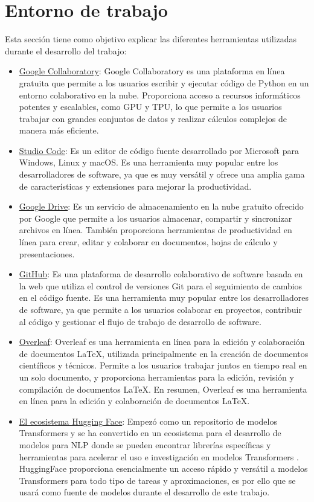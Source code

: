 \section{Entorno de trabajo}\label{entorno}
Esta sección tiene como objetivo explicar las diferentes herramientas utilizadas durante el desarrollo del trabajo:

    \begin{itemize}
        \item \href{https://colab.research.google.com/}{Google Collaboratory}: Google Collaboratory es una plataforma en línea gratuita que permite a los usuarios escribir y ejecutar código de Python en un entorno colaborativo en la nube. Proporciona acceso a recursos informáticos potentes y escalables, como GPU y TPU, lo que permite a los usuarios trabajar con grandes conjuntos de datos y realizar cálculos complejos de manera más eficiente.
        \item \href{https://code.visualstudio.com/Visual}{Studio Code}: Es un editor de código fuente desarrollado por Microsoft para Windows, Linux y macOS. Es una herramienta muy popular entre los desarrolladores de software, ya que es muy versátil y ofrece una amplia gama de características y extensiones para mejorar la productividad. 
        \item \href{https://www.google.com/intl/es_es/drive/}{Google Drive}: Es un servicio de almacenamiento en la nube gratuito ofrecido por Google que permite a los usuarios almacenar, compartir y sincronizar archivos en línea. También proporciona herramientas de productividad en línea para crear, editar y colaborar en documentos, hojas de cálculo y presentaciones.
        \item \href{https://github.com/}{GitHub}: Es una plataforma de desarrollo colaborativo de software basada en la web que utiliza el control de versiones Git para el seguimiento de cambios en el código fuente. Es una herramienta muy popular entre los desarrolladores de software, ya que permite a los usuarios colaborar en proyectos, contribuir al código y gestionar el flujo de trabajo de desarrollo de software.
        \item \href{https://www.overleaf.com/}{Overleaf}: Overleaf es una herramienta en línea para la edición y colaboración de documentos LaTeX, utilizada principalmente en la creación de documentos científicos y técnicos. Permite a los usuarios trabajar juntos en tiempo real en un solo documento, y proporciona herramientas para la edición, revisión y compilación de documentos LaTeX. En resumen, Overleaf es una herramienta en línea para la edición y colaboración de documentos LaTeX.
        \item \href{https://huggingface.co/}{El ecosistema Hugging Face}: Empezó como un repositorio de modelos Transformers y se ha convertido en un ecosistema para el desarrollo de modelos para NLP donde se pueden encontrar librerías específicas y herramientas para acelerar el uso e investigación en modelos Transformers \cite{tunstall2022natural}. HuggingFace proporciona esencialmente un acceso rápido y versátil a modelos Transformers para todo tipo de tareas y aproximaciones, es por ello que se usará como fuente de modelos durante el desarrollo de este trabajo.


\end{itemize}

